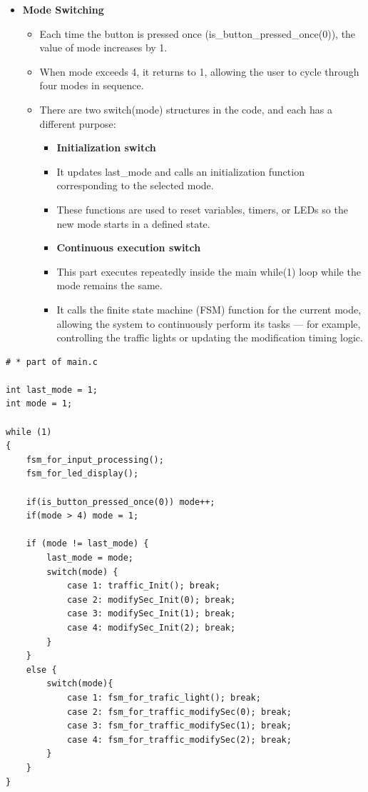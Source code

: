 \documentclass[a4paper,12pt]{article}
\begin{document}
\begin{itemize}
	\item[] \textbf{Mode Switching}
	\begin{itemize}
		\item[] Each time the button is pressed once (is\_button\_pressed\_once(0)), the value of mode increases by 1.
		\item[] When mode exceeds 4, it returns to 1, allowing the user to cycle through four modes in sequence.
		\item[] There are two switch(mode) structures in the code, and each has a different purpose:
		\begin{itemize}
			\item[] \textbf{Initialization switch}
			\item[] It updates last\_mode and calls an initialization function corresponding to the selected mode.
			\item[] These functions are used to reset variables, timers, or LEDs so the new mode starts in a defined state.
			\item[] \textbf{Continuous execution switch}
			\item[] This part executes repeatedly inside the main while(1) loop while the mode remains the same.
			\item[] It calls the finite state machine (FSM) function for the current mode, allowing the system to continuously perform its tasks — for example, controlling the traffic lights or updating the modification timing logic.
		\end{itemize}
	\end{itemize}
\end{itemize}
\begin{lstlisting}
# * part of main.c
	
int last_mode = 1;
int mode = 1;

while (1)
{
	fsm_for_input_processing();
	fsm_for_led_display();
	
	if(is_button_pressed_once(0)) mode++;
	if(mode > 4) mode = 1;
	
	if (mode != last_mode) {
		last_mode = mode;
		switch(mode) {
			case 1: traffic_Init(); break;
			case 2: modifySec_Init(0); break;
			case 3: modifySec_Init(1); break;
			case 4: modifySec_Init(2); break;
		}
	}
	else {
		switch(mode){
			case 1: fsm_for_trafic_light(); break;
			case 2: fsm_for_traffic_modifySec(0); break;
			case 3: fsm_for_traffic_modifySec(1); break;
			case 4: fsm_for_traffic_modifySec(2); break;
		}
	}
}
\end{lstlisting}
\newpage
\end{document}
